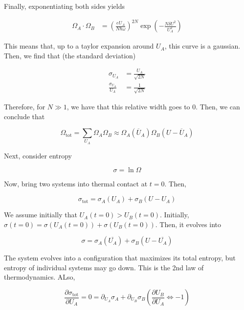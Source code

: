 \documentclass{article}
\newtheorem{one minute paper}[theorem]{One Minute Paper}
\begin{document}
Finally, exponentiating both sides yields 

\begin{align}
    \Omega_A \cdot \Omega_B &= \left( \frac{eU_A}{N\hbar \omega} \right)^{2N}\exp(-\frac{N\delta U^2}{U_A^2})
\end{align}

This means that, up to a taylor expansion around $U_A$, this curve is a gaussian. Then, we find that (the standard deviation)

\begin{align}
    \sigma_{U_A} &= \frac{U_A}{\sqrt{2N}} \\
    \frac{\sigma_{U_A}}{U_A} &= \frac{1}{\sqrt{2N}}
\end{align}

Therefore, for $N \gg 1$, we have that this relative width goes to $0$. Then, we can conclude that 

\begin{equation}
    \Omega_{\text{tot}} = \sum_{U_A}\Omega_A \Omega_B \approx \Omega_A(\overline{U}_A)\Omega_B(U - \overline{U}_A)
\end{equation}

Next, consider entropy 

\begin{equation}
    \sigma = \ln \Omega
\end{equation}

Now, bring two systems into thermal contact at $t=0$. Then, 

\begin{equation}
    \sigma_{\text{tot}} = \sigma_A(U_A) + \sigma_B(U - U_A)
\end{equation}

We assume initially that $U_A(t=0) > U_B(t=0)$. Initially, $\sigma(t=0) = \sigma(U_A(t=0)) + \sigma(U_B(t=0))$. Then, it evolves into 

\begin{equation}
    \sigma = \sigma_A(\overline{U_A}) + \sigma_B(U - \overline{U_A})
\end{equation}

The system evolves into a configuration that maximizes its total entropy, but entropy of individual systems may go down. This is the 2nd law of thermodynamics. ALso, 

\begin{equation}
    \frac{\partial \sigma_{\text{tot}}}{\partial U_A} = 0 = \partial_{U_A}\sigma_{A} + \partial_{U_B}\sigma_B \left( \frac{\partial U_B}{\partial U_A} \iff -1 \right)
\end{equation}
\end{document}
